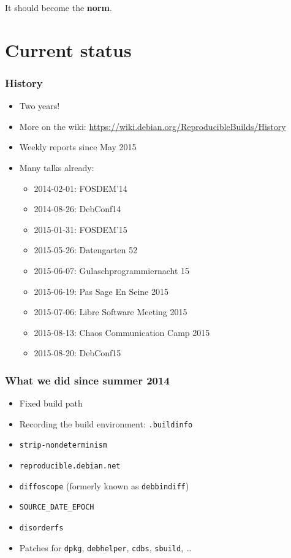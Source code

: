 \documentclass[14pt]{beamer}
\begin{document}
\begin{frame}[plain]
\begin{center}
 \Huge It should become the \textbf{norm}.
\end{center}

\end{frame}

\section{Current status}

\begin{frame}
 \frametitle{History}

 \begin{itemize}
  \item Two years!
  \item More on the wiki:
    {\small \url{https://wiki.debian.org/ReproducibleBuilds/History}}
  \item Weekly reports since May 2015
  \item Many talks already:
   \begin{itemize}
    \item 2014-02-01: FOSDEM’14
    \item 2014-08-26: DebConf14
    \item 2015-01-31: FOSDEM’15
    \item 2015-05-26: Datengarten 52
    \item 2015-06-07: Gulaschprogrammiernacht 15
    \item 2015-06-19: Pas Sage En Seine 2015
    \item 2015-07-06: Libre Software Meeting 2015
    \item 2015-08-13: Chaos Communication Camp 2015
    \item 2015-08-20: DebConf15
   \end{itemize}
 \end{itemize}
\end{frame}

\begin{frame}
 \frametitle{What we did since summer 2014}

 \begin{itemize}
  \item Fixed build path
  \item Recording the build environment: \texttt{.buildinfo}
  \item \texttt{strip-nondeterminism}
  \item \texttt{reproducible.debian.net}
  \item \texttt{diffoscope} (formerly known as \texttt{debbindiff})
  \item \texttt{SOURCE\_DATE\_EPOCH}
  \item \texttt{disorderfs}
  \item Patches for \texttt{dpkg}, \texttt{debhelper}, \texttt{cdbs}, \texttt{sbuild}, …
 \end{itemize}
\end{frame}
\end{document}
